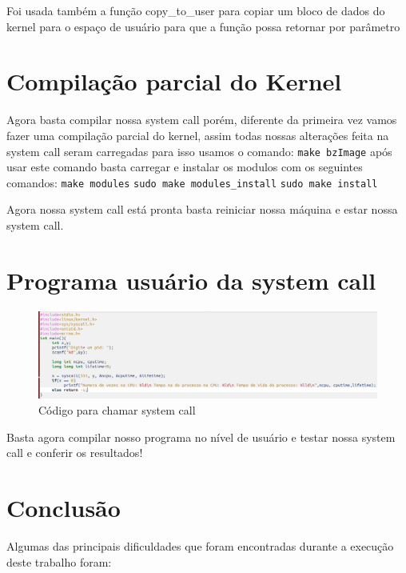 \documentclass[12pt]{article}
\begin{document}
	Foi usada também a função copy\_to\_user para copiar um bloco de dados do kernel para o espaço de usuário para que a função possa retornar por parâmetro
 \pagebreak
 
\section{Compilação parcial do Kernel}
	Agora basta compilar nossa system call porém, diferente da primeira vez vamos fazer uma compilação parcial do kernel, assim todas nossas alterações feita na system call seram carregadas para isso usamos o comando: \newline
	\verb"make bzImage" \newline
após usar este comando basta carregar e instalar os modulos com os seguintes comandos:\newline
	\verb"make modules" \newline
	\verb"sudo make modules_install" \newline
	\verb"sudo make install" \newline
	
	Agora nossa system call está pronta basta reiniciar nossa máquina e estar nossa system call.
 
\section{Programa usuário da system call}
\begin{figure}[!htb]
\includegraphics[scale=0.37]{imagens/cod.png} 
	\caption{Código para chamar system call}
\end{figure}

	Basta agora compilar nosso programa no nível de usuário e testar nossa system call e conferir os resultados!

\pagebreak	
	
\section{Conclusão}
Algumas das principais dificuldades que foram encontradas durante a execução deste trabalho foram:
\end{document}
